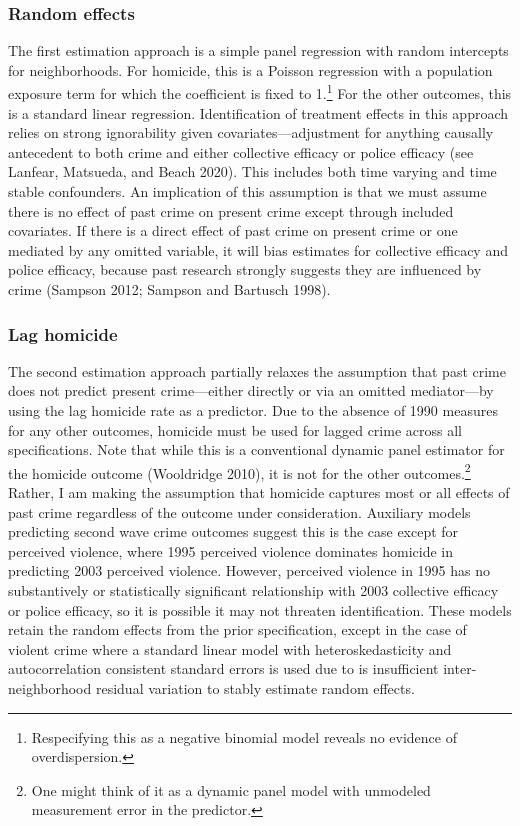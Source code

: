 \documentclass [11pt, proquest] {uwthesis}[2015/03/03]
\begin{document}
\hypertarget{random-effects}{%
\subsubsection{Random effects}\label{random-effects}}

The first estimation approach is a simple panel regression with random intercepts for neighborhoods. For homicide, this is a Poisson regression with a population exposure term for which the coefficient is fixed to 1.\footnote{Respecifying this as a negative binomial model reveals no evidence of overdispersion.} For the other outcomes, this is a standard linear regression. Identification of treatment effects in this approach relies on strong ignorability given covariates---adjustment for anything causally antecedent to both crime and either collective efficacy or police efficacy (see Lanfear, Matsueda, and Beach 2020). This includes both time varying and time stable confounders. An implication of this assumption is that we must assume there is no effect of past crime on present crime except through included covariates. If there is a direct effect of past crime on present crime or one mediated by any omitted variable, it will bias estimates for collective efficacy and police efficacy, because past research strongly suggests they are influenced by crime (Sampson 2012; Sampson and Bartusch 1998).

\hypertarget{lag-homicide}{%
\subsubsection{Lag homicide}\label{lag-homicide}}

The second estimation approach partially relaxes the assumption that past crime does not predict present crime---either directly or via an omitted mediator---by using the lag homicide rate as a predictor. Due to the absence of 1990 measures for any other outcomes, homicide must be used for lagged crime across all specifications. Note that while this is a conventional dynamic panel estimator for the homicide outcome (Wooldridge 2010), it is not for the other outcomes.\footnote{One might think of it as a dynamic panel model with unmodeled measurement error in the predictor.} Rather, I am making the assumption that homicide captures most or all effects of past crime regardless of the outcome under consideration. Auxiliary models predicting second wave crime outcomes suggest this is the case except for perceived violence, where 1995 perceived violence dominates homicide in predicting 2003 perceived violence. However, perceived violence in 1995 has no substantively or statistically significant relationship with 2003 collective efficacy or police efficacy, so it is possible it may not threaten identification. These models retain the random effects from the prior specification, except in the case of violent crime where a standard linear model with heteroskedasticity and autocorrelation consistent standard errors is used due to is insufficient inter-neighborhood residual variation to stably estimate random effects.
\end{document}
